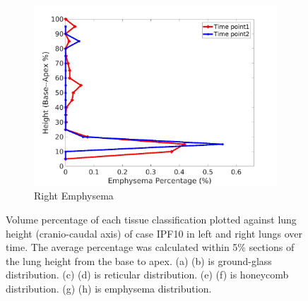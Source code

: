 \begin{figure}[H]
\begin{subfigure}{.42\linewidth}
  \includegraphics[width=\linewidth,trim={{.0\wd0} {.0\wd0} {.0\wd0} {.0\wd0}},clip]{Appendix/Image_AppexA/BaseToApex/IPF10RightLungEmphysemaDiseaseAgainstHeight.jpg}
  \caption{Right Emphysema}
  \label{fig:IPF10DiseaseAgainstHeight-h}
\end{subfigure}
\caption{Volume percentage of each tissue classification plotted against lung height (cranio-caudal axis) of case IPF10 in left and right lungs over time. The average percentage was calculated within 5\% sections of the lung height from the base to apex. (a) (b) is ground-glass distribution. (c) (d) is reticular distribution. (e) (f) is honeycomb distribution. (g) (h) is emphysema distribution.}
\label{fig:IPF10DiseaseAgainstHeight}
\end{figure}

